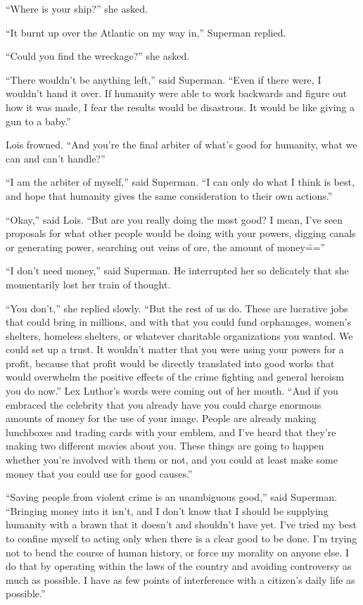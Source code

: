 \documentclass[ebook,12pt]{memoir}
\begin{document}
``Where is your ship?'' she asked.

``It burnt up over the Atlantic on my way in,'' Superman replied.

``Could you find the wreckage?'' she asked.

``There wouldn't be anything left,'' said Superman. ``Even if there
were, I wouldn't hand it over. If humanity were able to work backwards
and figure out how it was made, I fear the results would be disastrous.
It would be like giving a gun to a baby.''

Lois frowned. ``And you're the final arbiter of what's good for
humanity, what we can and can't handle?''

``I am the arbiter of myself,'' said Superman. ``I can only do what I
think is best, and hope that humanity gives the same consideration to
their own actions.''

``Okay,'' said Lois. ``But are you really doing the most good? I mean,
I've seen proposals for what other people would be doing with your
powers, digging canals or generating power, searching out veins of ore,
the amount of money\===''

``I don't need money,'' said Superman. He interrupted her so delicately
that she momentarily lost her train of thought.

``You don't,'' she replied slowly. ``But the rest of us do. These are
lucrative jobs that could bring in millions, and with that you could
fund orphanages, women's shelters, homeless shelters, or whatever
charitable organizations you wanted. We could set up a trust. It
wouldn't matter that you were using your powers for a profit, because
that profit would be directly translated into good works that would
overwhelm the positive effects of the crime fighting and general heroism
you do now.'' Lex Luthor's words were coming out of her mouth. ``And if
you embraced the celebrity that you already have you could charge
enormous amounts of money for the use of your image. People are already
making lunchboxes and trading cards with your emblem, and I've heard
that they're making two different movies about you. These things are
going to happen whether you're involved with them or not, and you could
at least make some money that you could use for good causes.''

``Saving people from violent crime is an unambiguous good,'' said
Superman. ``Bringing money into it isn't, and I don't know that I should
be supplying humanity with a brawn that it doesn't and shouldn't have
yet. I've tried my best to confine myself to acting only when there is a
clear good to be done. I'm trying not to bend the course of human
history, or force my morality on anyone else. I do that by operating
within the laws of the country and avoiding controversy as much as
possible. I have as few points of interference with a citizen's daily
life as possible.''
\end{document}
